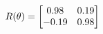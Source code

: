 \documentclass[preview]{standalone}
\begin{document}
\begin{align*}
\special{dvisvgm:raw <g id='unique000'>}R(\theta) = \begin{bmatrix}0.98 & 0.19\\-0.19 & 0.98\end{bmatrix}\special{dvisvgm:raw </g>}
\end{align*}
\end{document}
